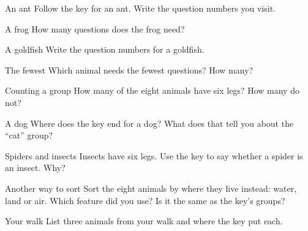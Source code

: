 \clearpage

\begin{puzzle}{An ant}
Follow the key for an ant. Write the question numbers you visit. \wline[5cm]
\end{puzzle}

\begin{puzzle}{A frog}
How many questions does the frog need? \wline[1.6cm]
\end{puzzle}

\begin{puzzle}{A goldfish}
Write the question numbers for a goldfish. \wline[5cm]
\end{puzzle}

\begin{puzzle}{The fewest}
Which animal needs the fewest questions? \wline[3cm] How many? \wline[1.6cm]
\end{puzzle}

\begin{puzzle}{Counting a group}
How many of the eight animals have six legs? \wline[1.6cm] How many do not? \wline[1.6cm]
\end{puzzle}

\clearpage

\begin{puzzle}{A dog}
Where does the key end for a dog? \wline[3cm] What does that tell you about the ``cat'' group? \wline[5cm]
\end{puzzle}

\begin{puzzle}{Spiders and insects}
Insects have six legs. Use the key to say whether a spider is an insect. \wline[3cm] Why? \wline[4cm]
\end{puzzle}

\begin{puzzle}{Another way to sort}
Sort the eight animals by where they live instead: water, land or air. Which feature did you use? \wline[3cm] Is it the same as the key's groups? \wline[3cm]
\end{puzzle}

\begin{puzzle}{Your walk}
List three animals from your walk and where the key put each. \wline[6cm]
\end{puzzle}

